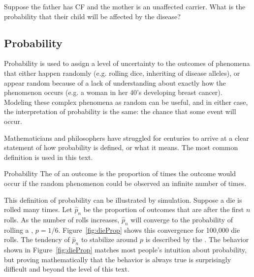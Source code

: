 \textD{\newpage}

\begin{exercisewrap}
\begin{nexercise}
Suppose the father has CF and the mother is an unaffected carrier. What is the probability that their child will be affected by the disease?\footnotemark{}
\end{nexercise}
\end{exercisewrap}

\subsection{Probability}


Probability is used to assign a level of uncertainty to the outcomes of phenomena that either happen randomly (e.g. rolling dice, inheriting of disease alleles), or appear random because of a lack of understanding about exactly how the phenomenon occurs (e.g. a woman in her 40's developing breast cancer). Modeling these complex phenomena as random can be useful, and in either case, the interpretation of probability is the same: the chance that some event will occur.

Mathematicians and philosophers have struggled for centuries to arrive at a clear statement of how probability is defined, or what it means. The most common definition is used in this text.

\begin{onebox}{Probability}
The  of an outcome is the proportion of times the outcome would occur if the random phenomenon could be observed an infinite number of times.
\end{onebox}


This definition of probability can be illustrated by simulation. Suppose a die is rolled many times. Let $\hat{p}_n$ be the proportion of outcomes that are  after the first $n$ rolls. As the number of rolls increases, $\hat{p}_n$ will converge to the probability of rolling a , $p = 1/6$. Figure~\ref{fig:dieProp} shows this convergence for 100,000 die rolls. The tendency of $\hat{p}_n$ to stabilize around $p$ is described by the . The behavior shown in Figure~\ref{fig:dieProp} matches most people's intuition about probability, but proving mathematically that the behavior is always true is surprisingly difficult and beyond the level of this text.

